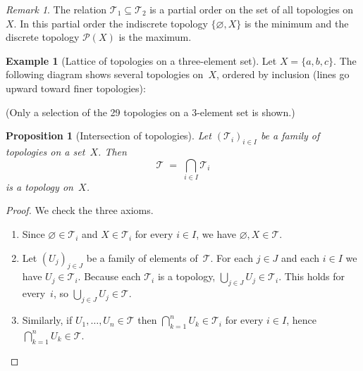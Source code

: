 \documentclass[11pt,a4paper,twoside]{book}
\newtheorem{proposition}[theorem]{Proposition}
\theoremstyle{remark}
\newtheorem{remark}[theorem]{Remark}
\theoremstyle{definition}
\newtheorem{exampleplain}[theorem]{Example}
\theoremstyle{definition}
\newcommand{\Tau}{\mathcal{T}}           %
\newcommand{\Pow}{\mathcal{P}}           %
\begin{document}
\begin{remark}
The relation $\Tau_1\subseteq\Tau_2$ is a partial order on the set of all
topologies on~$X$.  In this partial order the indiscrete topology
$\{\varnothing,X\}$ is the minimum and the discrete topology $\Pow(X)$ is the
maximum.
\end{remark}

\begin{exampleplain}[Lattice of topologies on a three-element set]
\label{ex:lattice-three}
Let $X=\{a,b,c\}$.  The following diagram shows several topologies on~$X$,
ordered by inclusion (lines go upward toward finer topologies):
\begin{center}
\end{center}
(Only a selection of the 29 topologies on a 3-element set is shown.)
\end{exampleplain}

\begin{proposition}[Intersection of topologies]
\label{prop:intersection-topologies}
Let $(\Tau_i)_{i\in I}$ be a family of topologies on a set~$X$.  Then
\[
  \Tau \;=\; \bigcap_{i\in I}\Tau_i
\]
is a topology on~$X$.
\end{proposition}

\begin{proof}
We check the three axioms.
\begin{enumerate}[label=(\roman*)]
  \item Since $\varnothing\in\Tau_i$ and $X\in\Tau_i$ for every $i\in I$,
        we have $\varnothing,X\in\Tau$.
  \item Let $(U_j)_{j\in J}$ be a family of elements of~$\Tau$.  For each
        $j\in J$ and each $i\in I$ we have $U_j\in\Tau_i$.  Because each
        $\Tau_i$ is a topology, $\bigcup_{j\in J}U_j\in\Tau_i$.  This holds
        for every~$i$, so $\bigcup_{j\in J}U_j\in\Tau$.
  \item Similarly, if $U_1,\ldots,U_n\in\Tau$ then
        $\bigcap_{k=1}^{n}U_k\in\Tau_i$ for every $i\in I$, hence
        $\bigcap_{k=1}^{n}U_k\in\Tau$.  \qedhere
\end{enumerate}
\end{proof}
\end{document}
